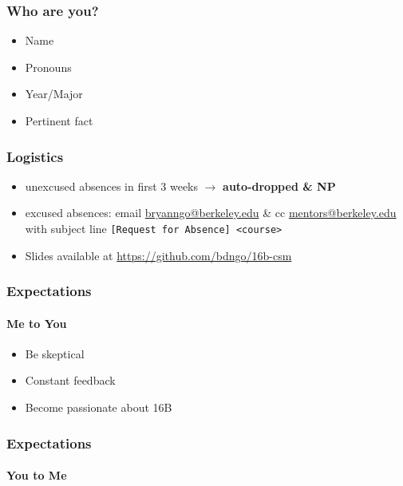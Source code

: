 \documentclass[aspectratio=169]{beamer}
\begin{document}
\begin{frame}
    \frametitle{Who are you?}

    \begin{itemize}
        \item Name
        \item Pronouns
        \item Year/Major
        \item Pertinent fact
    \end{itemize}
\end{frame}

\begin{frame}
    \frametitle{Logistics}

    \begin{itemize}
        \item unexcused absences in first 3 weeks \(\to\) \textbf{auto-dropped \& NP}
        \item excused absences: email \href{mailto:bryanngo@berkeley.edu}{bryanngo@berkeley.edu} \& cc \href{mailto:mentors@berkeley.edu}{mentors@berkeley.edu} with subject line \texttt{[Request for Absence] <course>}
        \item Slides available at \url{https://github.com/bdngo/16b-csm}
    \end{itemize}
\end{frame}

\begin{frame}
    \frametitle{Expectations}
    \framesubtitle{Me to You}

    \begin{itemize}
        \item Be skeptical
        \item Constant feedback
        \item Become passionate about 16B
    \end{itemize}
\end{frame}

\begin{frame}
    \frametitle{Expectations}
    \framesubtitle{You to Me}

\end{frame}


\end{document}
